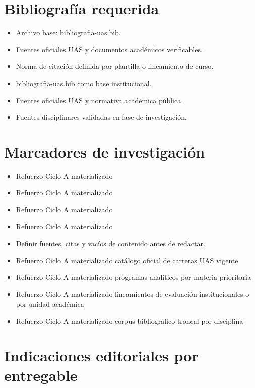\documentclass[12pt]{article}
\begin{document}
\section*{Bibliografía requerida}
\begin{itemize}[leftmargin=*]
  \item Archivo base: bibliografia-uas.bib.
  \item Fuentes oficiales UAS y documentos académicos verificables.
  \item Norma de citación definida por plantilla o lineamiento de curso.
  \item bibliografia-uas.bib como base institucional.
  \item Fuentes oficiales UAS y normativa académica pública.
  \item Fuentes disciplinares validadas en fase de investigación.
\end{itemize}

\section*{Marcadores de investigación}
\begin{itemize}[leftmargin=*]
  \item Refuerzo Ciclo A materializado
  \item Refuerzo Ciclo A materializado
  \item Refuerzo Ciclo A materializado
  \item Refuerzo Ciclo A materializado
  \item Definir fuentes, citas y vacíos de contenido antes de redactar.
  \item Refuerzo Ciclo A materializado catálogo oficial de carreras UAS vigente
  \item Refuerzo Ciclo A materializado programas analíticos por materia prioritaria
  \item Refuerzo Ciclo A materializado lineamientos de evaluación institucionales o por unidad académica
  \item Refuerzo Ciclo A materializado corpus bibliográfico troncal por disciplina
\end{itemize}

\section*{Indicaciones editoriales por entregable}
\end{document}
